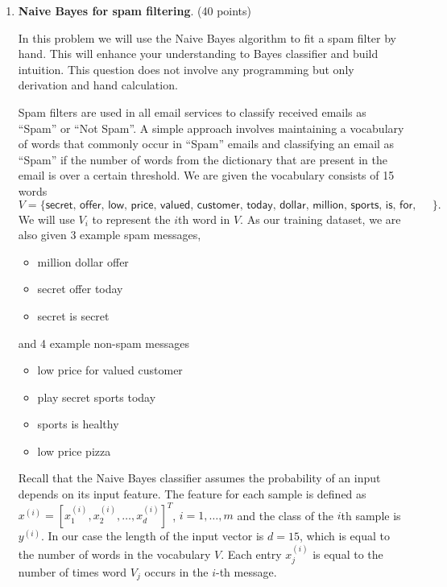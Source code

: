 \documentclass[twoside,10pt]{article}
\begin{document}
\begin{enumerate}
\begin{itemize}
\end{itemize}


\item {\bf Naive Bayes for spam filtering}. (40 points) %

In this problem we will use the Naive Bayes algorithm to fit a spam filter by hand. This will enhance your understanding to Bayes classifier and build intuition. This question does not involve any programming but only derivation and hand calculation. 

Spam filters are used in all email services to classify received emails as ``Spam'' or ``Not Spam''. A simple approach involves maintaining a vocabulary of words that commonly occur in ``Spam'' emails and classifying an email as ``Spam'' if the number of words from the dictionary that are present in the email is over a certain threshold.
We are given the vocabulary consists of 15 words \[V=\{\textsf{secret, offer, low, price, valued, customer, today, dollar, million, sports, is, for, play, healthy, pizza}\}.\] We will use $V_i$ to represent the $i$th word in $V$. As our training dataset, we are also given 3 example spam messages,
\begin{itemize}
\item \textsf{million dollar offer}
\item \textsf{secret offer today}
\item \textsf{secret is secret}
\end{itemize}
and 4 example non-spam messages
\begin{itemize}
\item \textsf{low price for valued customer}
\item \textsf{play secret sports today}
\item \textsf{sports is healthy}
\item \textsf{low price pizza}
\end{itemize}

Recall that the Naive Bayes classifier assumes the probability of an input depends on its input feature. The feature for each sample is defined as
$x^{(i)} = [x_1^{(i)}, x_2^{(i)}, \ldots, x_d^{(i)}]^T$, $i = 1, \ldots, m$ and the class of the $i$th sample is $y^{(i)}$. In our case the length of the input vector is $d = 15$, which is equal to the number of words in the vocabulary $V$. Each entry $x_j^{(i)}$ is equal to the number of times word $V_j$ occurs in the $i$-th message. %


\end{enumerate}
\end{document}
